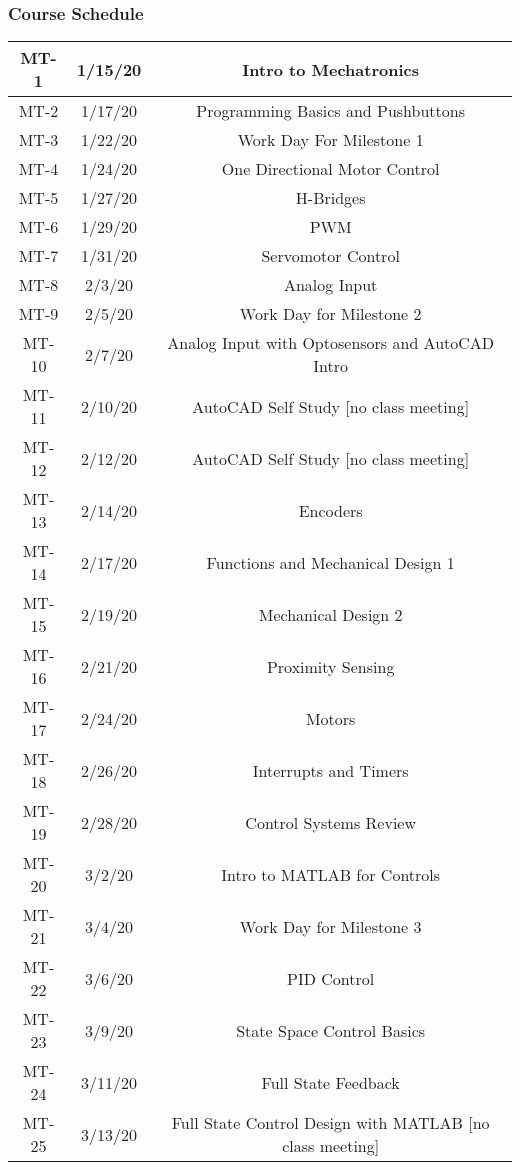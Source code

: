 \documentclass[12pt,letterpaper,onecolumn]{report}
\begin{document}
\subsubsection*{Course Schedule}
\begin{center}
\begin{tabular}{|c|c|c|}
\hline 
MT-1 & 1/15/20 & Intro to Mechatronics \\ 
\hline 
MT-2 & 1/17/20 & Programming Basics and Pushbuttons \\ 
\hline 
MT-3 & 1/22/20 & Work Day For Milestone 1 \\ 
\hline 
MT-4 & 1/24/20 & One Directional Motor Control \\ 
\hline 
MT-5 & 1/27/20 & H-Bridges\\ 
\hline
MT-6 & 1/29/20 & PWM\\ 
\hline  
MT-7 & 1/31/20 & Servomotor Control\\ 
\hline  
MT-8 & 2/3/20 & Analog Input\\ 
\hline  
MT-9 & 2/5/20 & Work Day for Milestone 2\\ 
\hline 
MT-10 & 2/7/20 & Analog Input with Optosensors and AutoCAD Intro\\ 
\hline 
MT-11 & 2/10/20 & AutoCAD Self Study [no class meeting]\\ 
\hline 
MT-12 & 2/12/20 & AutoCAD Self Study [no class meeting]\\ 
\hline 
MT-13 & 2/14/20 & Encoders\\ 
\hline 
MT-14 & 2/17/20 & Functions and Mechanical Design 1\\ 
\hline 
MT-15 & 2/19/20 & Mechanical Design 2\\ 
\hline 
MT-16 & 2/21/20 & Proximity Sensing\\ 
\hline 
MT-17 & 2/24/20 & Motors\\ 
\hline 
MT-18 & 2/26/20 & Interrupts and Timers\\ 
\hline 
MT-19 & 2/28/20 & Control Systems Review\\ 
\hline 
MT-20 & 3/2/20 & Intro to MATLAB for Controls\\ 
\hline 
MT-21 & 3/4/20 & Work Day for Milestone 3\\ 
\hline 
MT-22 & 3/6/20 & PID Control\\ 
\hline 
MT-23 & 3/9/20 & State Space Control Basics\\ 
\hline 
MT-24 & 3/11/20 & Full State Feedback\\ 
\hline 
MT-25 & 3/13/20 & Full State Control Design with MATLAB [no class meeting]\\ 

\end{tabular}
\end{center}
\end{document}
